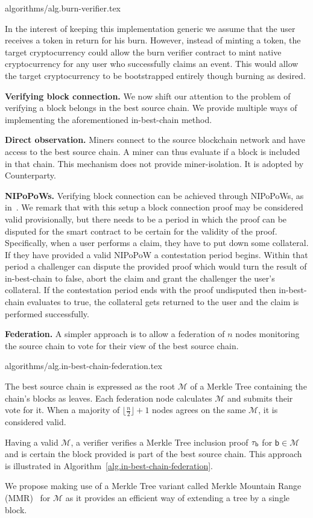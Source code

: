 {algorithms/alg.burn-verifier.tex}

In the interest of keeping this implementation generic we assume that the user receives a token in return for his burn. However, instead of minting a token, the target cryptocurrency could allow the burn verifier contract to mint native cryptocurrency for any user who successfully claims an event. This would allow the target cryptocurrency to be bootstrapped entirely though burning as desired.

\noindent
\textbf{Verifying block connection.}
We now shift our attention to the problem of verifying a block belongs in the best source chain. We provide multiple ways of implementing the aforementioned \textsf{in-best-chain} method.

\noindent
\textbf{Direct observation.}
Miners connect to the source blockchain network and have access to the best source chain. A miner can thus evaluate if a block is included in that chain. This mechanism does not provide miner-isolation. It is adopted by Counterparty.

\noindent
\textbf{NIPoPoWs.}
Verifying block connection can be achieved through NIPoPoWs, as in~\cite{pow-sidechains}.
We remark that with this setup a block connection proof may be considered valid provisionally, but there needs to be a period in which the proof can be disputed for the smart contract to be certain for the validity of the proof. Specifically, when a user performs a claim, they have to put down some collateral. If they have provided a valid NIPoPoW a contestation period begins. Within that period a challenger can dispute the provided proof which would turn the result of \textsf{in-best-chain} to false, abort the claim and grant the challenger the user's collateral. If the contestation period ends with the proof undisputed then \textsf{in-best-chain} evaluates to true, the collateral gets returned to the user and the claim is performed successfully.

\noindent
\textbf{Federation.}
A simpler approach is to allow a federation of $n$ nodes monitoring the source chain to vote for their view of the best source chain.

{algorithms/alg.in-best-chain-federation.tex}

The best source chain is expressed as the root $\mathcal{M}$ of a Merkle Tree containing the chain's blocks as leaves. Each federation node calculates $\mathcal{M}$ and submits their vote for it. When a majority of $\lfloor\frac{n}{2}\rfloor + 1$ nodes agrees on the same $\mathcal{M}$, it is considered valid.

Having a valid $\mathcal{M}$, a verifier verifies a Merkle Tree inclusion proof $\tau_\textsf{b}$ for $\textsf{b} \in \mathcal{M}$ and is certain the block provided is part of the best source chain. This approach is illustrated in Algorithm~\ref{alg.in-best-chain-federation}.

We propose making use of a Merkle Tree variant called Merkle Mountain Range (MMR)~\cite{flyclient} for $\mathcal{M}$ as it provides an efficient way of extending a tree by a single block.
